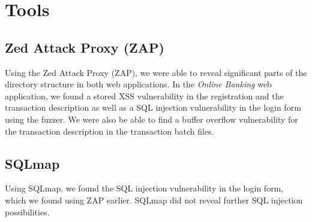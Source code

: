 \chapter{Tools}\label{chapter:tools}

\section{Zed Attack Proxy (ZAP)}
Using the Zed Attack Proxy (ZAP), we were able to reveal significant parts of the directory structure in both web applications. In the \textit{Online Banking} web application, we found a stored XSS vulnerability in the registration and the transaction description as well as a SQL injection vulnerability in the login form using the fuzzer. We were also be able to find a buffer overflow vulnerability for the transaction description in the transaction batch files.

\section{SQLmap}
Using SQLmap, we found the SQL injection vulnerability in the login form, which we found using ZAP earlier. SQLmap did not reveal further SQL injection possibilities.
